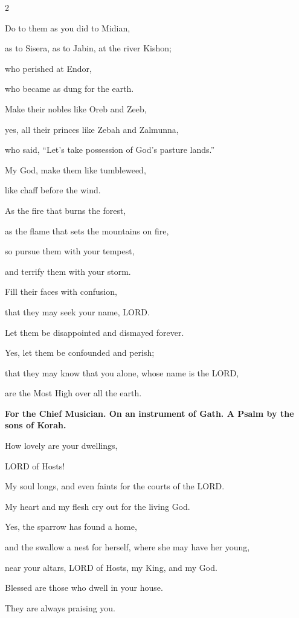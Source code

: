 \begin{multicols}{2}
	
	\myverse{}Do to them as you did to Midian,
	
	as to Sisera, as to Jabin, at the river Kishon;
	
	
	\myverse{}who perished at Endor,
	
	who became as dung for the earth.
	
	
	\myverse{}Make their nobles like Oreb and Zeeb,
	
	yes, all their princes like Zebah and Zalmunna,
	
	
	\myverse{}who said, “Let’s take possession of God’s pasture
	lands.”
	
	
	\myverse{}My God, make them like tumbleweed,
	
	like chaff before the wind.
	
	
	\myverse{}As the fire that burns the forest,
	
	as the flame that sets the mountains on fire,
	
	
	\myverse{}so pursue them with your tempest,
	
	and terrify them with your storm.
	
	
	\myverse{}Fill their faces with confusion,
	
	that they may seek your name, LORD.
	
	
	\myverse{}Let them be disappointed and dismayed forever.
	
	Yes, let them be confounded and perish;
	
	
	\myverse{}that they may know that you alone, whose name is the LORD,
	
	are the Most High over all the earth.
	
	
	\mychapter{}\textbf{For the Chief Musician. On an instrument of Gath. A Psalm by the sons of Korah.}
	
	\myverse*{}How lovely are your dwellings,
	
	LORD of Hosts!
	
	
	\myverse{}My soul longs, and even faints for the courts of the LORD.
	
	My heart and my flesh cry out for the living God.
	
	
	\myverse{}Yes, the sparrow has found a home,
	
	and the swallow a nest for herself, where she may have her young,
	
	near your altars, LORD of Hosts, my King, and my God.
	
	
	\myverse{}Blessed are those who dwell in your house.
	
	They are always praising you.
	

\end{multicols}
